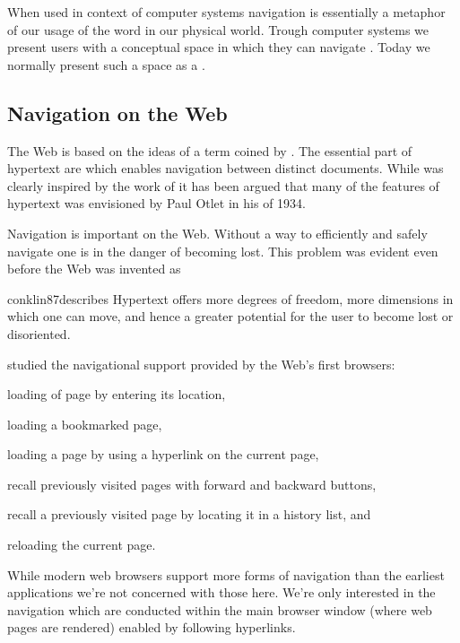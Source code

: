 When used in context of
computer systems navigation is essentially a metaphor of our usage of the
word in our physical world. Trough computer systems we present users with a
conceptual space in which they can navigate \citep[]{whiteside85}.
Today we normally present such a space as a %
.

\subsection{Navigation on the Web}
\label{section:background.navigation.navigation.on.the.web}

The Web is based on the ideas of \dash{}a term coined by
\citet[]{nelson65}. The essential part of hypertext are
 \citep[]{nelson65} which enables navigation between
distinct documents. While \citeauthor{nelson65} was clearly
inspired by the work of \citet{bush45} it has been argued \citep{rayward94}
that many of the features of hypertext was envisioned by Paul Otlet in his
 of 1934.

Navigation is important on the Web. Without a way to efficiently and safely
navigate one is in the danger of becoming lost. This problem was evident even
before the Web was invented as
\begin{fullquote}[\p{38}]{conklin87}{describes}
  Hypertext offers more degrees of freedom, more dimensions in which one
  can move, and hence a greater potential for the user
  to become lost or disoriented.
\end{fullquote}

\citet{jones96} studied the navigational support provided by the Web's first
browsers:
\begin{inparaenum}[(i)]
  \item loading of page by entering its location,
  \item loading a bookmarked page,
  \item loading a page by using a hyperlink on the current page,
  \item recall previously visited pages with forward and backward buttons,
  \item recall a previously visited page by locating it in a history list, and
  \item reloading the current page.
\end{inparaenum}
While modern web browsers support more forms of navigation%
than the earliest applications we're not concerned with those here.
We're only interested in the navigation which are conducted within the main
browser window (where web pages are rendered) enabled by following hyperlinks.

